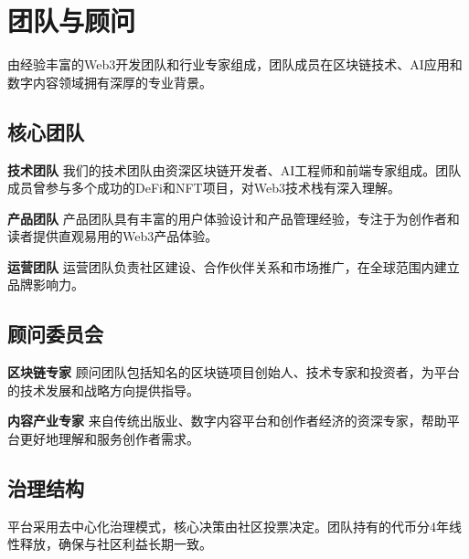 \section{团队与顾问}\label{sec:team-advisors-cn}

\storyhouse{}由经验丰富的Web3开发团队和行业专家组成，团队成员在区块链技术、AI应用和数字内容领域拥有深厚的专业背景。

\subsection{核心团队}

\textbf{技术团队}
我们的技术团队由资深区块链开发者、AI工程师和前端专家组成。团队成员曾参与多个成功的DeFi和NFT项目，对Web3技术栈有深入理解。

\textbf{产品团队}
产品团队具有丰富的用户体验设计和产品管理经验，专注于为创作者和读者提供直观易用的Web3产品体验。

\textbf{运营团队}
运营团队负责社区建设、合作伙伴关系和市场推广，在全球范围内建立\storyhouse{}品牌影响力。

\subsection{顾问委员会}

\textbf{区块链专家}
顾问团队包括知名的区块链项目创始人、技术专家和投资者，为平台的技术发展和战略方向提供指导。

\textbf{内容产业专家}
来自传统出版业、数字内容平台和创作者经济的资深专家，帮助平台更好地理解和服务创作者需求。

\subsection{治理结构}

平台采用去中心化治理模式，核心决策由社区投票决定。团队持有的代币分4年线性释放，确保与社区利益长期一致。